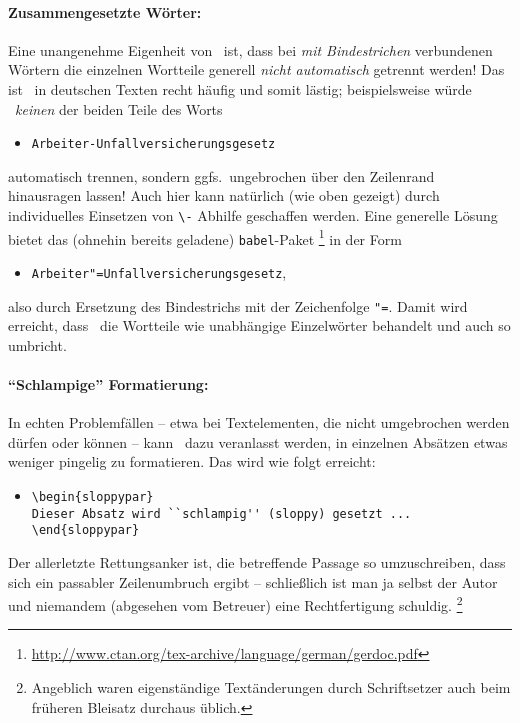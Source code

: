 \paragraph{Zusammengesetzte Wörter:}
Eine unangenehme Eigenheit von \latex\ ist, dass bei \emph{mit Bindestrichen} verbundenen
Wörtern die einzelnen Wortteile generell \emph{nicht automatisch} getrennt werden!
Das ist \va\ in deutschen Texten recht häufig und somit lästig;
beispielsweise würde \latex\ \emph{keinen} der beiden Teile des Worts 
\begin{itemize}
\item[] \verb!Arbeiter-Unfallversicherungsgesetz!
\end{itemize}
automatisch trennen, sondern ggfs.\ ungebrochen über den Zeilenrand hinausragen
lassen! Auch hier kann natürlich (wie oben gezeigt) durch individuelles 
Einsetzen von \verb!\-! Abhilfe geschaffen werden. Eine generelle Lösung bietet das (ohnehin bereits
geladene) \texttt{babel}-Paket%
\footnote{\url{http://www.ctan.org/tex-archive/language/german/gerdoc.pdf}} in der Form
\begin{itemize}
\item[] \verb!Arbeiter"=Unfallversicherungsgesetz!,
\end{itemize}
also durch Ersetzung des Bindestrichs mit der Zeichenfolge \verb!"=!.
Damit wird erreicht, dass \latex\ die Wortteile wie unabhängige Einzelwörter behandelt
und auch so umbricht.

\paragraph{"`Schlampige"' Formatierung:}
In echten Problemfällen -- etwa bei Textelementen, die nicht umgebrochen 
werden dürfen oder können -- kann \latex\ dazu veranlasst werden, in einzelnen Absätzen
etwas weniger pingelig zu formatieren. Das wird wie folgt erreicht:
%
\begin{itemize}
\item[]
\begin{verbatim}
\begin{sloppypar}
Dieser Absatz wird ``schlampig'' (sloppy) gesetzt ...
\end{sloppypar}
\end{verbatim}
\end{itemize}
%
Der allerletzte Rettungsanker ist, die betreffende Passage so umzuschreiben, dass sich ein 
passabler Zeilenumbruch ergibt -- schließlich ist man ja selbst der Autor und 
niemandem (abgesehen vom Betreuer) eine Rechtfertigung schuldig.%
\footnote{Angeblich waren eigenständige Textänderungen durch Schriftsetzer
auch beim früheren Bleisatz durchaus üblich.}




